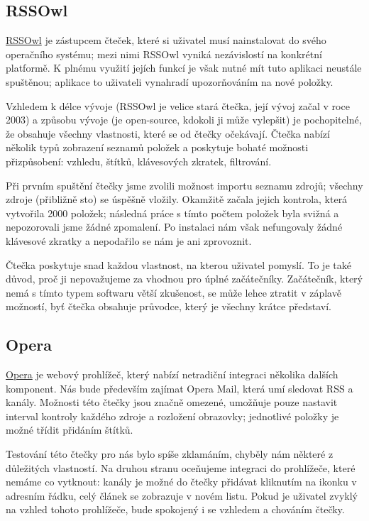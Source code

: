 \subsection{RSSOwl}

\href{http://www.rssowl.org/}{RSSOwl} je zástupcem čteček, které si uživatel musí nainstalovat do svého operačního systému; mezi nimi RSSOwl vyniká nezávislostí na konkrétní platformě.
K plnému využití jejích funkcí je však nutné mít tuto aplikaci neustále spuštěnou; aplikace to uživateli vynahradí upozorňováním na nové položky.

Vzhledem k délce vývoje (RSSOwl je velice stará čtečka, její vývoj začal v roce 2003) a způsobu vývoje (je open-source, kdokoli ji může vylepšit) je pochopitelné, že obsahuje všechny vlastnosti, které se od čtečky očekávají.
Čtečka nabízí několik typů zobrazení seznamů položek a poskytuje bohaté možnosti přizpůsobení: vzhledu, štítků, klávesových zkratek, filtrování.

Při prvním spuštění čtečky jsme zvolili možnost importu seznamu zdrojů; všechny zdroje (přibližně sto) se úspěšně vložily.
Okamžitě začala jejich kontrola, která vytvořila 2000 položek; následná práce s tímto počtem položek byla svižná a nepozorovali jsme žádné zpomalení.
Po instalaci nám však nefungovaly žádné klávesové zkratky a nepodařilo se nám je ani zprovoznit.

Čtečka poskytuje snad každou vlastnost, na kterou uživatel pomyslí.
To je také důvod, proč ji nepovažujeme za vhodnou pro úplné začátečníky.
Začátečník, který nemá s tímto typem softwaru větší zkušenost, se může lehce ztratit v záplavě možností, byť čtečka obsahuje průvodce, který je všechny krátce představí.

\subsection{Opera}

\href{http://www.opera.com/}{Opera} je webový prohlížeč, který nabízí netradiční integraci několika dalších komponent.
Nás bude především zajímat Opera Mail, která umí sledovat RSS a  kanály.
Možnosti této čtečky jsou značně omezené, umožňuje pouze nastavit interval kontroly každého zdroje a rozložení obrazovky; jednotlivé položky je možné třídit přidáním štítků.

Testování této čtečky pro nás bylo spíše zklamáním, chyběly nám některé z důležitých vlastností.
Na druhou stranu oceňujeme integraci do prohlížeče, které nemáme co vytknout: kanály je možné do čtečky přidávat kliknutím na ikonku v adresním řádku, celý článek se zobrazuje v novém listu.
Pokud je uživatel zvyklý na vzhled tohoto prohlížeče, bude spokojený i se vzhledem a chováním čtečky.

